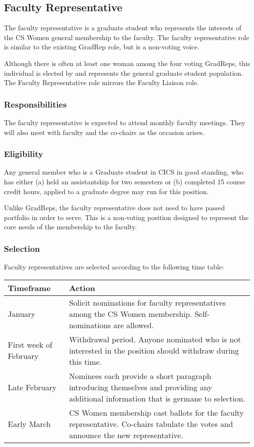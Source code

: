 \subsection{Faculty Representative}
\label{sec:facultyrep}
The faculty representative is a graduate student who represents the interests of the CS Women general membership to the faculty. The faculty representative role is similar to the existing GradRep role, but is a non-voting voice. 

Although there is often at least one woman among the four voting GradReps, this individual is elected by and represents the general graduate student population. The Faculty Representative role mirrors the Faculty Liaison role.


\subsubsection{Responsibilities}
The faculty representative is expected to attend monthly faculty meetings. They will also meet with faculty and the co-chairs as the occasion arises.

\subsubsection{Eligibility}
Any general member who is a Graduate student in CICS in good standing, who has either (a) held an assistantship for two semesters or (b) completed 15 course credit hours, applied to a graduate degree may run for this position.

Unlike GradReps, the faculty representative does not need to have passed portfolio in order to serve. This is a non-voting position designed to represent the core needs of the membership to the faculty.


\subsubsection{Selection}
Faculty representatives are selected according to the following time table:
\begin{center}
\begin{tabular}{|l p{5in}|}
	\hline
	Timeframe & Action\\
	\hline
	January & Solicit nominations for faculty representatives among the CS Women membership. Self-nominations are allowed. \\
	First week of February & Withdrawal period. Anyone nominated who is not interested in the position should withdraw during this time. \\
	Late February & Nominees each provide a short paragraph introducing themselves and providing any additional information that is germane to selection. \\
	Early March & CS Women membership cast ballots for the faculty representative. Co-chairs tabulate the votes and announce the new representative.\\
	\hline
\end{tabular}
\end{center}

